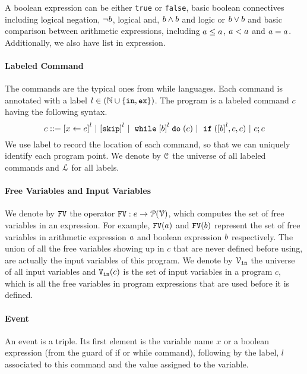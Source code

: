 %
A boolean expression can be either {\tt true} or {\tt false}, basic boolean connectives including logical negation,  $\neg b$, logical and, $b \land b$ and logic or
$b \lor b$ and basic comparison between arithmetic expressions, 
including $a \leq a$, $a < a$ and
$a = a$.
Additionally, we also have list in expression.

\paragraph{Labeled Command}
The commands are the typical ones from while languages. Each command is annotated with a label $l \in (\mathbb{N} \cup \{\mathtt{in}, \mathtt{ex}\})$. The program is a labeled command $c$ having the following syntax. 
\[
{c} ::= 
\clabel{\assign{x}{\expr}}^l 
~|~  \clabel{\eskip}^l
~|~ \ewhile \clabel{\bexpr}^{l} \edo ({c})
~|~ \eif(\clabel{\bexpr}^{l} , {c}, {c}) 
~|~ {c};{c} 
\]
We use label to record
the location of each command, so that we can uniquely identify each program point.
We denote by $\mathcal{C}$ the universe of all labeled commands and $\mathcal{L}$ for all labels.

\paragraph{Free Variables and Input Variables}
  We denote by $\mathtt{FV}$ the operator $\mathtt{FV}: e \to \mathcal{P}(\mathcal{V})$, which computes the set of free variables in an expression. For example,
  $\mathtt{FV}(a)$ and $\mathtt{FV}(b)$ represent the set of free variables in arithmetic
  expression $a$ and boolean expression $b$ respectively.
  The union of all the free variables
  showing up in $c$ that are never defined before using, are actually the input variables of this program.
  We denote by $\mathcal{V}_{\mathtt{\mathtt{in}}}$ the universe of all input variables and ${\mathtt{V_{\mathtt{in}}}}(c)$ is the set of input variables in a program $c$, which is all the free variables
  in program expressions that are used before it is defined.
  
\paragraph{Event}
An event is a triple.
Its first element is the variable name $x$
or a boolean expression (from the guard of if or while command), 
following by 
 the label, $l$ associated to this command and the value assigned to the variable.

